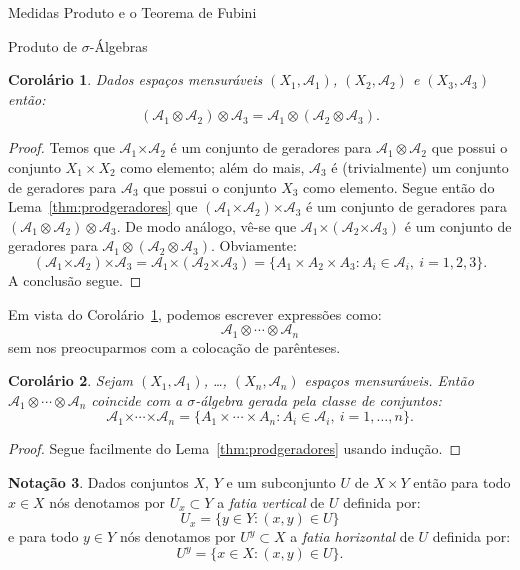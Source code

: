 \documentclass[oneside,final,11pt]{amsbook}
\newcommand{\Times}{\pmb{\times}}
\theoremstyle{remark}\newtheorem{exercise}{Exercício}[chapter]
\theoremstyle{remark}\newtheorem{*exercise}[exercise]{\hbox to 0pt{\hskip 0pt minus 1fil*}Exercício}
\theoremstyle{definition}\newtheorem{exdefin}{Definição}[chapter]
\theoremstyle{plain}\newtheorem{teo}{Teorema}[section]
\theoremstyle{plain}\newtheorem{lem}[teo]{Lema}
\theoremstyle{plain}\newtheorem{prop}[teo]{Proposição}
\theoremstyle{plain}\newtheorem{cor}[teo]{Corolário}
\theoremstyle{definition}\newtheorem{defin}[teo]{Definição}
\theoremstyle{remark}\newtheorem{rem}[teo]{Observação}
\theoremstyle{definition}\newtheorem{notation}[teo]{Notação}
\theoremstyle{definition}\newtheorem{convention}[teo]{Convenção}
\theoremstyle{definition}\newtheorem{example}[teo]{Exemplo}
\numberwithin{section}{chapter}
\numberwithin{equation}{section}
\begin{document}
\begin{chapter}{Medidas Produto e o Teorema de Fubini}
\begin{section}{Produto de ${\sigma}$-Álgebras}
\begin{cor}\label{thm:prodsigmaassoc}
Dados espaços mensuráveis $(X_1,\mathcal A_1)$, $(X_2,\mathcal A_2)$ e $(X_3,\mathcal A_3)$ então:
\[(\mathcal A_1\otimes\mathcal A_2)\otimes\mathcal A_3=\mathcal A_1\otimes(\mathcal A_2\otimes\mathcal A_3).\]
\end{cor}
\begin{proof}
Temos que $\mathcal A_1\Times\mathcal A_2$ é um conjunto de geradores para $\mathcal A_1\otimes\mathcal A_2$ que possui
o conjunto $X_1\times X_2$ como elemento; além do mais, $\mathcal A_3$ é (trivialmente) um conjunto de geradores
para $\mathcal A_3$ que possui o conjunto $X_3$ como elemento. Segue então do Lema~\ref{thm:prodgeradores} que
$(\mathcal A_1\Times\mathcal A_2)\Times\mathcal A_3$ é um conjunto de geradores para $(\mathcal A_1\otimes\mathcal A_2)\otimes\mathcal A_3$.
De modo análogo, vê-se que $\mathcal A_1\Times(\mathcal A_2\Times\mathcal A_3)$ é um conjunto de geradores
para $\mathcal A_1\otimes(\mathcal A_2\otimes\mathcal A_3)$. Obviamente:
\[(\mathcal A_1\Times\mathcal A_2)\Times\mathcal A_3=\mathcal A_1\Times(\mathcal A_2\Times\mathcal A_3)
=\big\{A_1\times A_2\times A_3:A_i\in\mathcal A_i,\ i=1,2,3\big\}.\]
A conclusão segue.
\end{proof}

Em vista do Corolário~\ref{thm:prodsigmaassoc}, podemos escrever expressões como:
\[\mathcal A_1\otimes\cdots\otimes\mathcal A_n\]
sem nos preocuparmos com a colocação de parênteses.
\begin{cor}
Sejam $(X_1,\mathcal A_1)$, \dots, $(X_n,\mathcal A_n)$ espaços men\-su\-rá\-veis. Então $\mathcal A_1\otimes\cdots\otimes\mathcal A_n$
coincide com a $\sigma$-álgebra gerada pela classe de conjuntos:
\[\mathcal A_1\Times\cdots\Times\mathcal A_n=\big\{A_1\times\cdots\times A_n:A_i\in\mathcal A_i,\ i=1,\ldots,n\big\}.\]
\end{cor}
\begin{proof}
Segue facilmente do Lema~\ref{thm:prodgeradores} usando indução.
\end{proof}

\begin{notation}
Dados conjuntos $X$, $Y$ e um subconjunto $U$ de $X\times Y$ então para todo $x\in X$ nós denotamos
por $U_x\subset Y$ a {\em fatia vertical\/} de $U$ definida por:
\begin{equation}\label{eq:fatiaverticalUx}
U_x=\big\{y\in Y:(x,y)\in U\big\}
\end{equation}
e para todo $y\in Y$ nós denotamos por $U^y\subset X$ a {\em fatia horizontal\/} de $U$ definida por:
\[U^y=\big\{x\in X:(x,y)\in U\big\}.\]
\end{notation}


\end{section}
\end{chapter}
\end{document}

